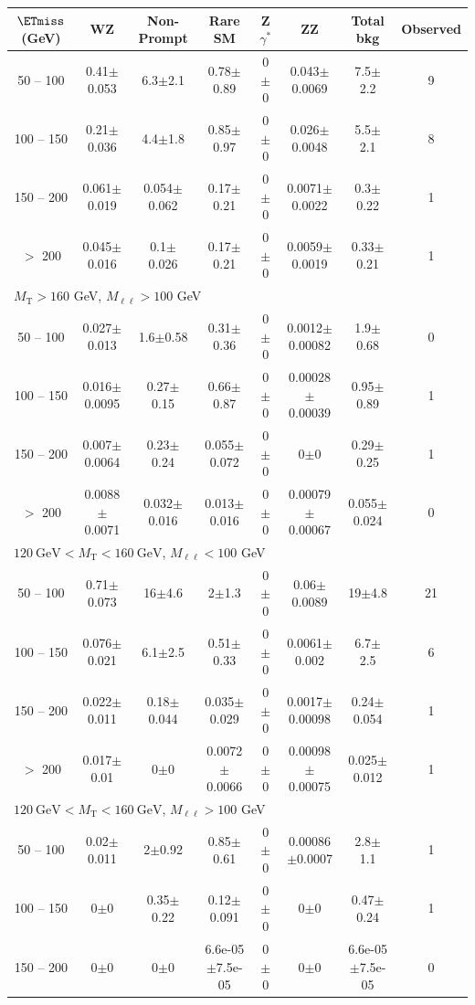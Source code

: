 \begin{landscape}
\begin{table}
\begin{center}
\begin{tabular}{| c | c c c c c c  c | }
$\ETmiss$ (GeV) & WZ & Non-Prompt & Rare SM & Z$\gamma^*$ & ZZ & Total bkg & Observed\\\hline\hline
50 -- 100&0.41$\pm$0.053&6.3$\pm$2.1&0.78$\pm$0.89&0$\pm$0&0.043$\pm$0.0069&7.5$\pm$2.2&9\\
100 -- 150&0.21$\pm$0.036&4.4$\pm$1.8&0.85$\pm$0.97&0$\pm$0&0.026$\pm$0.0048&5.5$\pm$2.1&8\\
150 -- 200&0.061$\pm$0.019&0.054$\pm$0.062&0.17$\pm$0.21&0$\pm$0&0.0071$\pm$0.0022&0.3$\pm$0.22&1\\
$>$ 200&0.045$\pm$0.016&0.1$\pm$0.026&0.17$\pm$0.21&0$\pm$0&0.0059$\pm$0.0019&0.33$\pm$0.21&1\\
\hline\hline
\multicolumn{8}{l}{$M_{\text{T}} > 160$ GeV, $M_{\ell\ell} > 100$ GeV}\\\hline\hline
50 -- 100&0.027$\pm$0.013&1.6$\pm$0.58&0.31$\pm$0.36&0$\pm$0&0.0012$\pm$0.00082&1.9$\pm$0.68&0\\
100 -- 150&0.016$\pm$0.0095&0.27$\pm$0.15&0.66$\pm$0.87&0$\pm$0&0.00028$\pm$0.00039&0.95$\pm$0.89&1\\
150 -- 200&0.007$\pm$0.0064&0.23$\pm$0.24&0.055$\pm$0.072&0$\pm$0&0$\pm$0&0.29$\pm$0.25&1\\
$>$ 200&0.0088$\pm$0.0071&0.032$\pm$0.016&0.013$\pm$0.016&0$\pm$0&0.00079$\pm$0.00067&0.055$\pm$0.024&0\\
\hline\hline
\multicolumn{8}{l}{$120~\mathrm{GeV} < M_{\text{T}} < 160~\mathrm{GeV}$, $M_{\ell\ell} < 100$ GeV}\\\hline\hline
50 -- 100&0.71$\pm$0.073&16$\pm$4.6&2$\pm$1.3&0$\pm$0&0.06$\pm$0.0089&19$\pm$4.8&21\\
100 -- 150&0.076$\pm$0.021&6.1$\pm$2.5&0.51$\pm$0.33&0$\pm$0&0.0061$\pm$0.002&6.7$\pm$2.5&6\\
150 -- 200&0.022$\pm$0.011&0.18$\pm$0.044&0.035$\pm$0.029&0$\pm$0&0.0017$\pm$0.00098&0.24$\pm$0.054&1\\
$>$ 200&0.017$\pm$0.01&0$\pm$0&0.0072$\pm$0.0066&0$\pm$0&0.00098$\pm$0.00075&0.025$\pm$0.012&1\\
\hline\hline
\multicolumn{8}{l}{$120~\mathrm{GeV} < M_{\text{T}} < 160~\mathrm{GeV}$, $M_{\ell\ell} > 100$ GeV}\\\hline\hline
50 -- 100&0.02$\pm$0.011&2$\pm$0.92&0.85$\pm$0.61&0$\pm$0&0.00086$\pm$0.0007&2.8$\pm$1.1&1\\
100 -- 150&0$\pm$0&0.35$\pm$0.22&0.12$\pm$0.091&0$\pm$0&0$\pm$0&0.47$\pm$0.24&1\\
150 -- 200&0$\pm$0&0$\pm$0&6.6e-05$\pm$7.5e-05&0$\pm$0&0$\pm$0&6.6e-05$\pm$7.5e-05&0\\

\end{tabular}
\end{center}
\end{table}
\end{landscape}
